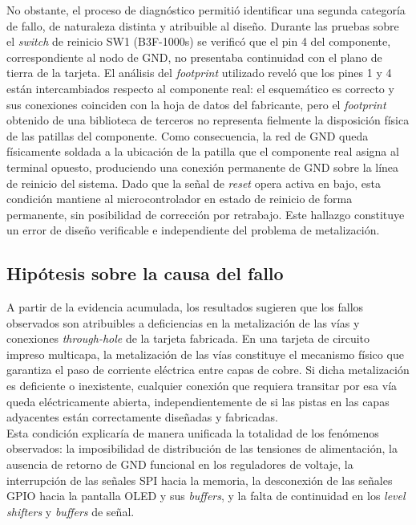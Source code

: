 \documentclass[journal,trans]{IEEEtran}
\begin{document}
No obstante, el proceso de diagnóstico permitió identificar una segunda categoría
de fallo, de naturaleza distinta y atribuible al diseño. Durante las pruebas sobre el
\textit{switch} de reinicio SW1 (B3F-1000s) se verificó que el pin 4 del componente,
correspondiente al nodo de GND, no presentaba continuidad con el plano de tierra de la
tarjeta. El análisis del \textit{footprint} utilizado reveló que los pines 1 y 4 están
intercambiados respecto al componente real: el esquemático es correcto y sus conexiones
coinciden con la hoja de datos del fabricante, pero el \textit{footprint} obtenido de
una biblioteca de terceros no representa fielmente la disposición física de las patillas
del componente. Como consecuencia, la red de GND queda físicamente soldada a la
ubicación de la patilla que el componente real asigna al terminal opuesto, produciendo
una conexión permanente de GND sobre la línea de reinicio del sistema. Dado que la
señal de \textit{reset} opera activa en bajo, esta condición mantiene al microcontrolador
en estado de reinicio de forma permanente, sin posibilidad de corrección por retrabajo.
Este hallazgo constituye un error de diseño verificable e independiente del problema de
metalización.

\subsection{Hipótesis sobre la causa del fallo}

A partir de la evidencia acumulada, los resultados sugieren que los fallos observados son
atribuibles a deficiencias en la metalización de las vías y conexiones
\textit{through-hole} de la tarjeta fabricada. En una tarjeta de circuito impreso
multicapa, la metalización de las vías constituye el mecanismo físico que garantiza el
paso de corriente eléctrica entre capas de cobre. Si dicha metalización es deficiente o
inexistente, cualquier conexión que requiera transitar por esa vía queda eléctricamente
abierta, independientemente de si las pistas en las capas adyacentes están correctamente
diseñadas y fabricadas.\\

Esta condición explicaría de manera
unificada la totalidad de los fenómenos observados: la imposibilidad de distribución de las
tensiones de alimentación, la ausencia de retorno de GND funcional en los reguladores de
voltaje, la interrupción de las señales SPI hacia la memoria, la desconexión de las señales
GPIO hacia la pantalla OLED y sus \textit{buffers}, y la falta de continuidad en los
\textit{level shifters} y \textit{buffers} de señal.\\
\end{document}
